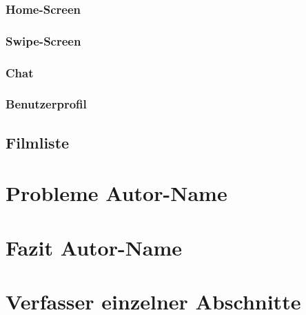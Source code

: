 \documentclass[11pt,a4paper]{article}
\begin{document}
\subsubsection{Home-Screen}
\label{sec:homescreen}

\subsubsection{Swipe-Screen}
\label{sec:swipescreen}

\subsubsection{Chat}
\label{sec:UI-Chat}

\subsubsection{Benutzerprofil}
\label{sec:benutzerprofil}

\subsection{Filmliste}
\clearpage

\section[Probleme]{Probleme \hfill \normalfont \small{Autor-Name}}
\clearpage

\section[Fazit]{Fazit \hfill \normalfont \small{Autor-Name}}
\clearpage

\appendix
\section{Verfasser einzelner Abschnitte}

\clearpage
\end{document}
